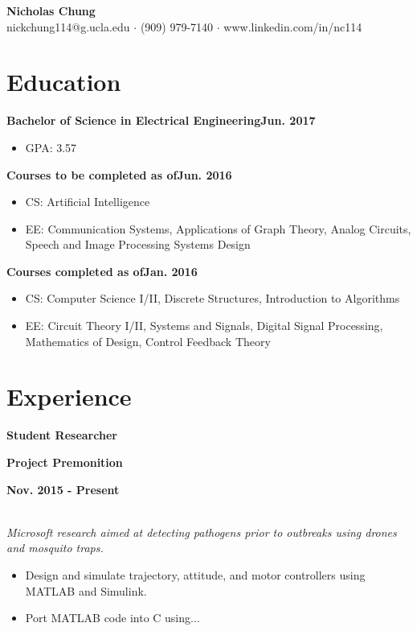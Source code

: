 \documentclass[12pt]{article}
\newcommand\textbox[1]{\parbox{.333\textwidth}{#1}}
\newcommand{\textlcr}[3]{\textbox{\textbf{#1}\hfill}\textbox{\hfil \textbf{#2}\hfil}\textbox{\hfill \textbf{#3}}}
\begin{document}
\begin{center}
	\textbf{\LARGE Nicholas Chung} \\ \vspace{.5ex}
	nickchung114@g.ucla.edu $\cdot$ (909) 979-7140 $\cdot$ www.linkedin.com/in/nc114
\end{center}

\section*{Education}
\vspace*{-1em}\makebox[\linewidth]{\rule{\textwidth}{0.4pt}}

\textbf{Bachelor of Science in Electrical Engineering}\hfill\textbf{Jun. 2017}
\begin{itemize}
\item GPA: 3.57
\end{itemize}

\textbf{Courses to be completed as of}\hfill\textbf{Jun. 2016}
\begin{itemize}
\item CS: Artificial Intelligence
\item EE: Communication Systems, Applications of Graph Theory, Analog Circuits, Speech and Image Processing Systems Design
\end{itemize}

\textbf{Courses completed as of}\hfill\textbf{Jan. 2016}
\begin{itemize}
\item CS: Computer Science I/II, Discrete Structures, Introduction to Algorithms
\item EE: Circuit Theory I/II, Systems and Signals, Digital Signal Processing, Mathematics of Design, Control Feedback Theory
\end{itemize}

\section*{Experience}
\vspace*{-1em}\makebox[\linewidth]{\rule{\textwidth}{0.4pt}}

\textlcr{Student Researcher}{Project Premonition}{Nov. 2015 - Present} \\
\textit{Microsoft research aimed at detecting pathogens prior to outbreaks using drones and mosquito traps.}
\begin{itemize}
\item Design and simulate trajectory, attitude, and motor controllers using MATLAB and Simulink.
\item Port MATLAB code into C using...
\end{itemize}
\end{document}
